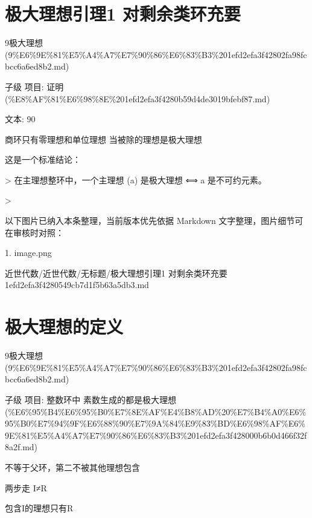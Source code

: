 \section*{极大理想引理1 对剩余类环充要}

\begin{note}[来源上级主题]

9极大理想 (9\%E6\%9E\%81\%E5\%A4\%A7\%E7\%90\%86\%E6\%83\%B3\%201efd2efa3f42802fa98fcbcc6a6ed8b2.md)

\end{note}

\begin{lemma}

子级 项目: 证明 (\%E8\%AF\%81\%E6\%98\%8E\%201efd2efa3f4280b59d4de3019bfebf87.md)

文本: 90

商环只有零理想和单位理想 当被除的理想是极大理想

这是一个标准结论：

> 在主理想整环中，一个主理想 (a) 是极大理想 ⟺ a 是不可约元素。

>

\end{lemma}

\begin{note}[关联图片]
以下图片已纳入本条整理，当前版本优先依据 Markdown 文字整理，图片细节可在审核时对照：

1. image.png\\

\end{note}

\begin{note}[来源路径]

近世代数/近世代数/无标题/极大理想引理1 对剩余类环充要 1efd2efa3f4280549cb7d1f5b63a5db3.md

\end{note}

\section*{极大理想的定义}

\begin{note}[来源上级主题]

9极大理想 (9\%E6\%9E\%81\%E5\%A4\%A7\%E7\%90\%86\%E6\%83\%B3\%201efd2efa3f42802fa98fcbcc6a6ed8b2.md)

\end{note}

\begin{definition}[极大理想的定义]

子级 项目: 整数环中 素数生成的都是极大理想 (\%E6\%95\%B4\%E6\%95\%B0\%E7\%8E\%AF\%E4\%B8\%AD\%20\%E7\%B4\%A0\%E6\%95\%B0\%E7\%94\%9F\%E6\%88\%90\%E7\%9A\%84\%E9\%83\%BD\%E6\%98\%AF\%E6\%9E\%81\%E5\%A4\%A7\%E7\%90\%86\%E6\%83\%B3\%201efd2efa3f428000b6b0d466f32f8a2f.md)

不等于父环，第二不被其他理想包含

两步走 I≠R

包含I的理想只有R

\end{definition}

